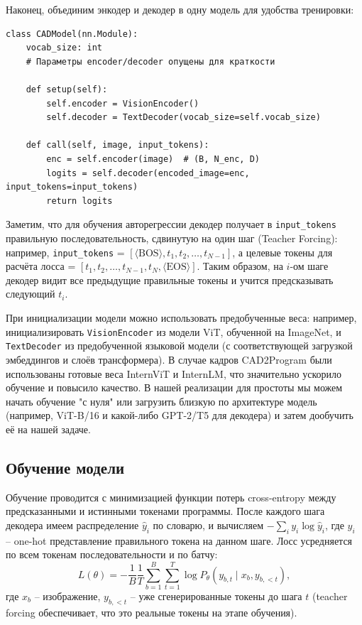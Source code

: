 \documentclass{article}
\begin{document}
Наконец, объединим энкодер и декодер в одну модель для удобства тренировки:

\begin{lstlisting}
class CADModel(nn.Module):
    vocab_size: int
    # Параметры encoder/decoder опущены для краткости
    
    def setup(self):
        self.encoder = VisionEncoder()
        self.decoder = TextDecoder(vocab_size=self.vocab_size)
    
    def call(self, image, input_tokens):
        enc = self.encoder(image)  # (B, N_enc, D)
        logits = self.decoder(encoded_image=enc, input_tokens=input_tokens)
        return logits
\end{lstlisting}

Заметим, что для обучения авторегрессии декодер получает в \texttt{input_tokens} правильную последовательность, сдвинутую на один шаг (Teacher Forcing): например, \texttt{input_tokens} = $[\langle \text{BOS}\rangle, t_1, t_2, \dots, t_{N-1}]$, а целевые токены для расчёта лосса = $[t_1, t_2, \dots, t_{N-1}, t_N, \langle \text{EOS}\rangle]$. Таким образом, на $i$-ом шаге декодер видит все предыдущие правильные токены и учится предсказывать следующий $t_i$.

При инициализации модели можно использовать предобученные веса: например, инициализировать \texttt{VisionEncoder} из модели ViT, обученной на ImageNet, и \texttt{TextDecoder} из предобученной языковой модели (с соответствующей загрузкой эмбеддингов и слоёв трансформера). В случае кадров CAD2Program были использованы готовые веса InternViT и InternLM, что значительно ускорило обучение и повысило качество. В нашей реализации для простоты мы можем начать обучение "с нуля" или загрузить близкую по архитектуре модель (например, ViT-B/16 и какой-либо GPT-2/T5 для декодера) и затем дообучить её на нашей задаче.

\subsection{Обучение модели}

Обучение проводится с минимизацией функции потерь cross-entropy между предсказанными и истинными токенами программы. После каждого шага декодера имеем распределение $\hat{y}_i$ по словарю, и вычисляем $-\sum_i y_{i}\log \hat{y}_i$, где $y_i$ – one-hot представление правильного токена на данном шаге. Лосс усредняется по всем токенам последовательности и по батчу:
$$L(\theta) = - \frac{1}{B}\frac{1}{T}\sum_{b=1}^B \sum_{t=1}^{T} \log P_\theta(y_{b,t} \mid x_b, y_{b,<t}),$$
где $x_b$ – изображение, $y_{b,<t}$ – уже сгенерированные токены до шага $t$ (teacher forcing обеспечивает, что это реальные токены на этапе обучения).
\end{document}
